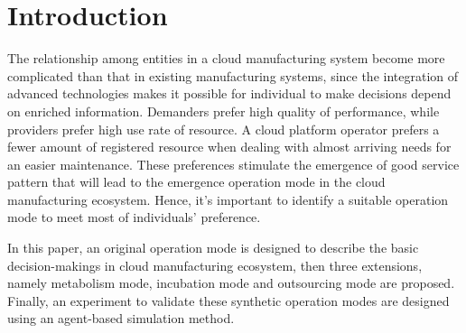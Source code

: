 \section{Introduction}
The relationship among entities in a cloud manufacturing system become more complicated than that in existing manufacturing systems, since the integration of advanced technologies makes it possible for individual to make decisions depend on enriched information. Demanders prefer high quality of performance, while providers prefer high use rate of resource. A cloud platform operator prefers a fewer amount of registered resource when dealing with almost arriving needs for an easier maintenance. These preferences stimulate the emergence of good service pattern that will lead to the emergence operation mode in the cloud manufacturing ecosystem. Hence, it's important to identify a suitable operation mode to meet most of individuals' preference.

In this paper, an original operation mode is designed to describe the basic decision-makings in cloud manufacturing ecosystem, then three extensions, namely metabolism mode, incubation mode and outsourcing mode are proposed. Finally, an experiment to validate these synthetic operation modes are designed using an agent-based simulation method.
